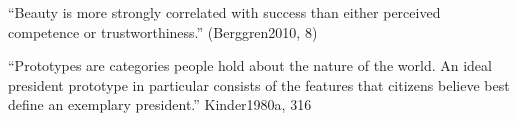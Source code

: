 		``Beauty is more strongly correlated with success than either perceived competence or trustworthiness.'' (Berggren2010, 8)

		``Prototypes are categories people hold about the nature of the world. An ideal president prototype in particular consists of the features that citizens believe best define an exemplary president.'' Kinder1980a, 316













	














